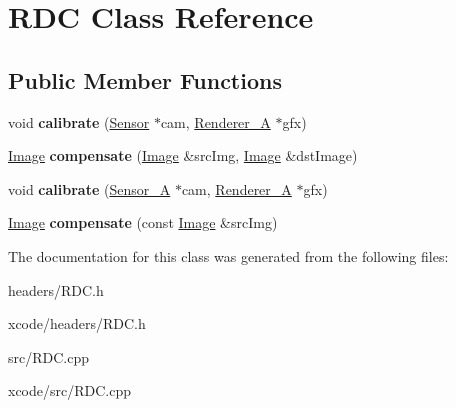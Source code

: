 \hypertarget{class_r_d_c}{\section{R\-D\-C Class Reference}
\label{class_r_d_c}
}
\subsection*{Public Member Functions}
\begin{DoxyCompactItemize}
\item 
\hypertarget{class_r_d_c_a56c0f20047fc83a8a4fa002ded594224}{void {\bfseries calibrate} (\hyperlink{class_sensor}{Sensor} $\ast$cam, \hyperlink{class_renderer___a}{Renderer\-\_\-\-A} $\ast$gfx)}\label{class_r_d_c_a56c0f20047fc83a8a4fa002ded594224}

\item 
\hypertarget{class_r_d_c_a8faa2ae6fe46e42d4a015108da9bda04}{\hyperlink{class_image}{Image} {\bfseries compensate} (\hyperlink{class_image}{Image} \&src\-Img, \hyperlink{class_image}{Image} \&dst\-Image)}\label{class_r_d_c_a8faa2ae6fe46e42d4a015108da9bda04}

\item 
\hypertarget{class_r_d_c_a70face7e6f7c3f65772614fca001a52e}{void {\bfseries calibrate} (\hyperlink{class_sensor___a}{Sensor\-\_\-\-A} $\ast$cam, \hyperlink{class_renderer___a}{Renderer\-\_\-\-A} $\ast$gfx)}\label{class_r_d_c_a70face7e6f7c3f65772614fca001a52e}

\item 
\hypertarget{class_r_d_c_afd4c8763d879d5c811ed1329d1ab12a2}{\hyperlink{class_image}{Image} {\bfseries compensate} (const \hyperlink{class_image}{Image} \&src\-Img)}\label{class_r_d_c_afd4c8763d879d5c811ed1329d1ab12a2}

\end{DoxyCompactItemize}


The documentation for this class was generated from the following files\-:\begin{DoxyCompactItemize}
\item 
headers/R\-D\-C.\-h\item 
xcode/headers/R\-D\-C.\-h\item 
src/R\-D\-C.\-cpp\item 
xcode/src/R\-D\-C.\-cpp\end{DoxyCompactItemize}
